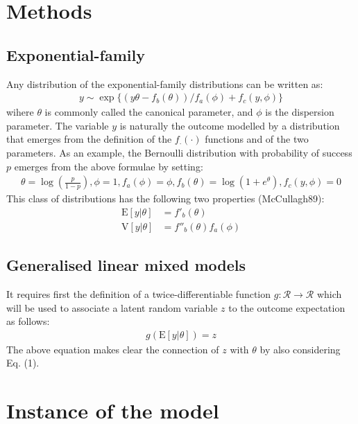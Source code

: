 \section{Methods}

\subsection{Exponential-family}

Any distribution of the exponential-family distributions can be written as:
\begin{align*}
  y \sim \exp\{(y\theta - f_b(\theta))/f_a(\phi) + f_c(y, \phi)\}
\end{align*}
wihere $\theta$ is commonly called the canonical parameter, and $\phi$ is the
dispersion parameter. The variable $y$ is naturally the outcome modelled by a
distribution that emerges from the definition of the $f_{\cdot}(\cdot)$
functions and of the two parameters. As an example, the Bernoulli distribution
with probability of success $p$ emerges from the above formulae by setting:
\begin{align*}
  \theta = \log\left(\frac{p}{1-p}\right), \phi = 1, f_a(\phi) = \phi,
	f_b(\theta)=\log(1+e^\theta), f_c(y, \phi) = 0
\end{align*}
This class of distributions has the following two properties (McCullagh89):
\begin{align*}
  \mathrm E[y|\theta] &= f'_b(\theta)\\
  \mathrm V[y|\theta] &= f''_b(\theta) f_a(\phi)
\end{align*}

\subsection{Generalised linear mixed models}

It requires first the definition of a twice-differentiable function
$g:\mathcal R \rightarrow \mathcal R$ which will be used to associate a latent
random variable $z$ to the outcome expectation as follows:
\begin{align*}
  g(\mathrm E[y|\theta]) = z
\end{align*}
The above equation makes clear the connection of $z$ with $\theta$ by also
considering Eq. (1).

\section{Instance of the model}

